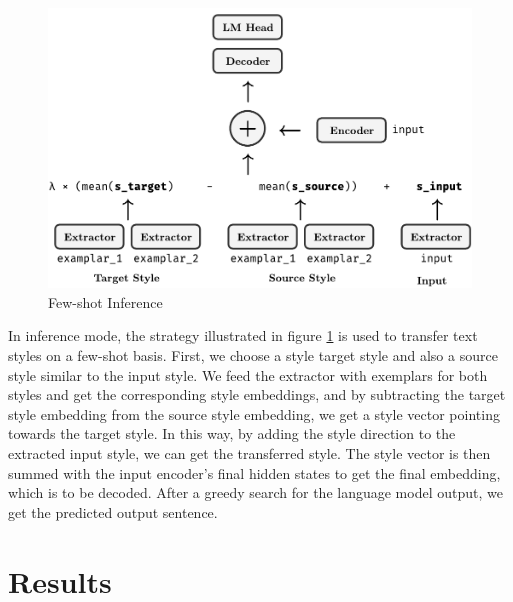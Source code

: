 \documentclass[a4paper]{article}
\begin{document}
\begin{figure}[H]
    \includegraphics[width=\linewidth]{eval.pdf}
    \caption{Few-shot Inference}
    \label{fig:eval}
\end{figure}

In inference mode, the strategy illustrated in figure \ref{fig:eval} is used to transfer text styles on a few-shot basis. First, we choose a style target style and also a source style similar to the input style. We feed the extractor with exemplars for both styles and get the corresponding style embeddings, and by subtracting the target style embedding from the source style embedding, we get a style vector pointing towards the target style. In this way, by adding the style direction to the extracted input style, we can get the transferred style. The style vector is then summed with the input encoder's final hidden states to get the final embedding, which is to be decoded. After a greedy search for the language model output, we get the predicted output sentence.

\section{Results}
\end{document}
